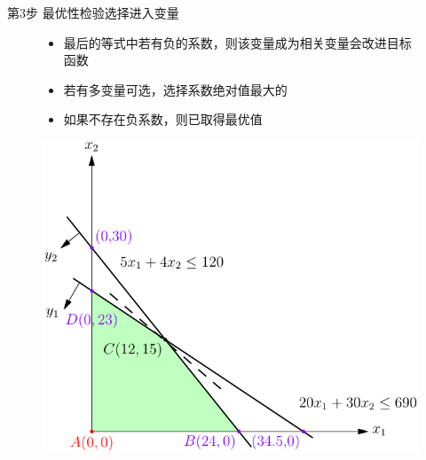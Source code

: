 \documentclass[mathserif, table]{beamer}
\begin{document}
\begin{frame}{第3步 最优性检验选择进入变量}
  \begin{figure}
    \begin{minipage}{.5\linewidth}
      \begin{itemize}
      \item 最后的等式中若有负的系数，则该变量成为相关变量会改进目标函数
      \item 若有多变量可选，选择系数绝对值最大的
      \item 如果不存在负系数，则已取得最优值
      \end{itemize}
    \end{minipage}%
    \begin{minipage}{.5\linewidth}
      \includegraphics[width=\textwidth{}]{simplex-improve.pdf}
    \end{minipage}
  \end{figure}  
\end{frame}
\end{document}
